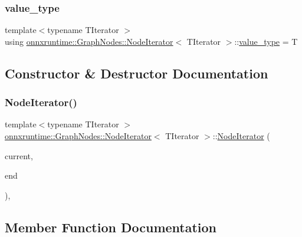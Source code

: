\subsubsection{\texorpdfstring{value\+\_\+type}{value\_type}}
{\footnotesize\ttfamily template$<$typename T\+Iterator $>$ \\
using \mbox{\hyperlink{classonnxruntime_1_1GraphNodes_1_1NodeIterator}{onnxruntime\+::\+Graph\+Nodes\+::\+Node\+Iterator}}$<$ T\+Iterator $>$\+::\mbox{\hyperlink{classonnxruntime_1_1GraphNodes_1_1NodeIterator_ace084d92e9afa50a4e42e40832255a4e}{value\+\_\+type}} =  T}



\subsection{Constructor \& Destructor Documentation}
\mbox{\label{classonnxruntime_1_1GraphNodes_1_1NodeIterator_a038d87fb128b4326e5e8cdf95409aa55}} 
\subsubsection{\texorpdfstring{Node\+Iterator()}{NodeIterator()}}
{\footnotesize\ttfamily template$<$typename T\+Iterator $>$ \\
\mbox{\hyperlink{classonnxruntime_1_1GraphNodes_1_1NodeIterator}{onnxruntime\+::\+Graph\+Nodes\+::\+Node\+Iterator}}$<$ T\+Iterator $>$\+::\mbox{\hyperlink{classonnxruntime_1_1GraphNodes_1_1NodeIterator}{Node\+Iterator}} (\begin{DoxyParamCaption}\item[{T\+Iterator}]{current,  }\item[{const T\+Iterator}]{end }\end{DoxyParamCaption})\hspace{0.3cm}{\ttfamily [inline]}, {\ttfamily [noexcept]}}



\subsection{Member Function Documentation}
\mbox{\label{classonnxruntime_1_1GraphNodes_1_1NodeIterator_a42301307247fac7a7888c863f734ab21}} 
